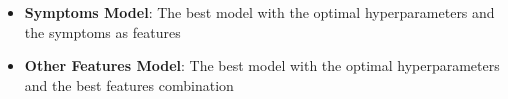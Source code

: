 \begin{itemize}
	\setlength\itemsep{0.4em} %
	\item \textbf{Symptoms Model}: The best model with the optimal hyperparameters and the symptoms as features
	\item \textbf{Other Features Model}: The best model with the optimal hyperparameters and the best features combination
\end{itemize}
\vspace{0.4cm}


